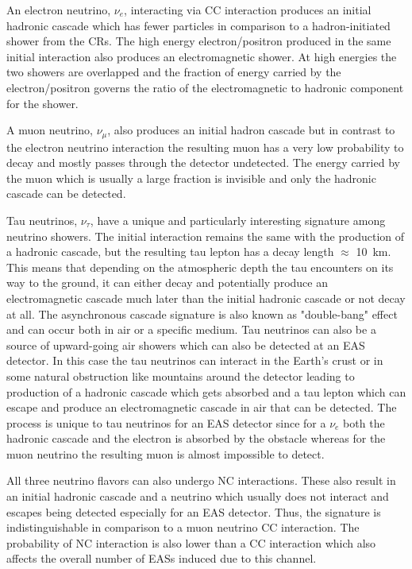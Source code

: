 An electron neutrino, $\nu_e$, interacting via CC interaction produces an initial hadronic cascade which has fewer particles in comparison to a hadron-initiated shower from the CRs. The high energy electron/positron produced in the same initial interaction also produces an electromagnetic shower. At high energies the two showers are overlapped and the fraction of energy carried by the electron/positron governs the ratio of the electromagnetic to hadronic component for the shower.

A muon neutrino, $\nu_{\mu}$, also produces an initial hadron cascade but in contrast to the electron neutrino interaction the resulting muon has a very low probability to decay and mostly passes through the detector undetected. The energy carried by the muon which is usually a large fraction is invisible and only the hadronic cascade can be detected.

Tau neutrinos, $\nu_{\tau}$, have a unique and particularly interesting signature among neutrino showers. The initial interaction remains the same with the production of a hadronic cascade, but the resulting tau lepton has a decay length $\approx$ 10 km. This means that depending on the atmospheric depth the tau encounters on its way to the ground, it can either decay and potentially produce an electromagnetic cascade much later than the initial hadronic cascade or not decay at all. The asynchronous cascade signature is also known as "double-bang" effect and can occur both in air or a specific medium. Tau neutrinos can also be a source of upward-going air showers which can also be detected at an EAS detector. In this case the tau neutrinos can interact in the Earth's crust or in some natural obstruction like mountains around the detector leading to production of a hadronic cascade which gets absorbed and a tau lepton which can escape and produce an electromagnetic cascade in air that can be detected. The process is unique to tau neutrinos for an EAS detector since for a $\nu_e$ both the hadronic cascade and the electron is absorbed by the obstacle whereas for the muon neutrino the resulting muon is almost impossible to detect.  

All three neutrino flavors can also undergo NC interactions. These also result in an initial hadronic cascade and a neutrino which usually does not interact and escapes being detected especially for an EAS detector. Thus, the signature is indistinguishable in comparison to a muon neutrino CC interaction. The probability of NC interaction is also lower than a CC interaction which also affects the overall number of EASs induced due to this channel.

